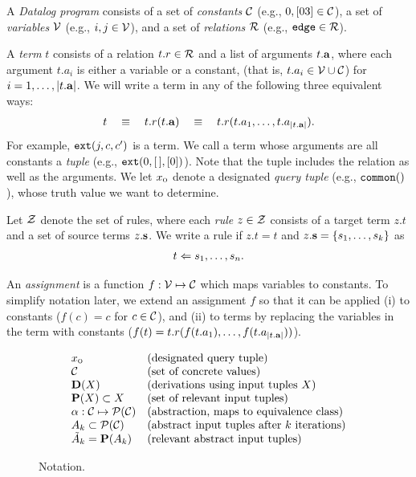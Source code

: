 
A {\em Datalog program} consists of
a set of {\em constants} $\mathcal{C}$ (e.g., $0,[03] \in \mathcal{C}$),
a set of {\em variables} $\mathcal{V}$ (e.g., $i, j \in \mathcal{V}$), and
a set of {\em relations} $\mathcal{R}$ (e.g., $\text{\tt edge} \in \mathcal{R}$).

A {\em term} $t$ consists of a relation $t.r \in \mathcal{R}$ and a list of arguments $t.\mathbf{a}$,
where each argument $t.a_i$ is either a variable or a constant,
(that is, $t.a_i \in \mathcal{V} \cup \mathcal{C}$) for $i = 1, \dots, |t.\mathbf{a}|$.
We will write a term in any of the following three equivalent ways:
\begin{align}
t \quad\equiv\quad t.r(t.\mathbf{a}) \quad\equiv\quad t.r(t.a_1, \dots, t.a_{|t.\mathbf{a}|}).
\end{align}
For example, $\text{\tt ext}(j,c,c')$ is a term.
We call a term whose arguments are all constants a {\em tuple}
(e.g., $\text{\tt ext}(0, [\,], [0])$).
Note that the tuple includes the relation as well as the arguments.
We let $x_\text{\sc o}$ denote a designated {\em query tuple} (e.g., $\text{\tt common}()$),
whose truth value we want to determine.

Let $\mathcal{Z}$ denote the set of rules,
where each {\em rule} $z \in \mathcal{Z}$ consists of a target term $z.t$ and a set of source terms $z.\mathbf{s}$.
We write a rule if $z.t = t$ and $z.\mathbf{s} = \{ s_1, \dots, s_k \}$ as
\begin{align}
t \Leftarrow s_1, \dots, s_n.
\end{align}

An {\em assignment} is a function $f : \mathcal{V} \mapsto \mathcal{C}$ which maps variables to
constants.  To simplify notation later, we extend an assignment $f$ so that it
can be applied (i) to constants ($f(c) = c$ for $c \in \mathcal{C}$), and (ii) to terms by
replacing the variables in the term with constants ($f(t) = t.r(f(t.a_1), \dots, f(t.a_{|t.\mathbf{a}|}))$).

\begin{figure}[ht]
\[
\begin{array}{ll}
x_\text{\sc o}                           & \text{(designated query tuple)} \\
\mathcal{C}                           & \text{(set of concrete values)} \\
\mathbf{D}(X)                        & \text{(derivations using input tuples $X$)} \\
\mathbf{P}(X) \subset X              & \text{(set of relevant input tuples)} \\
\alpha : \mathcal{C} \mapsto \mathcal{P}(\mathcal{C}) & \text{(abstraction, maps to equivalence class)} \\
A_k \subset \mathcal{P}(\mathcal{C})          & \text{(abstract input tuples after $k$ iterations)} \\
\tilde A_k = \mathbf{P}(A_k)         & \text{(relevant abstract input tuples)} \\
\end{array}
\]
\caption{\label{fig:notation} Notation.}
\end{figure}

